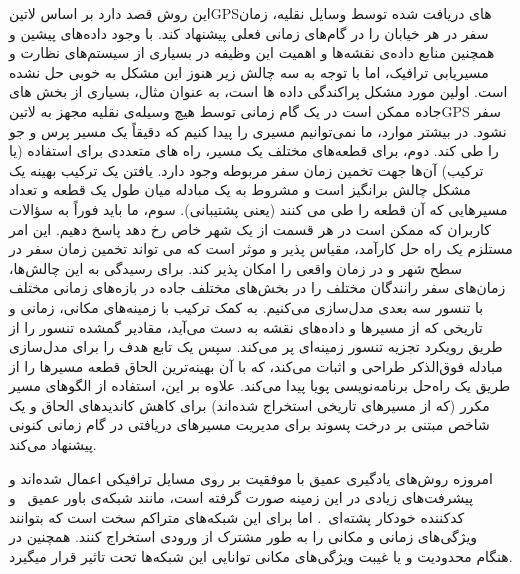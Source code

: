 این روش قصد دارد بر اساس ‌لاتین{GPS}های دریافت شده توسط وسایل نقلیه، زمان سفر در هر خیابان را در گام‌های زمانی فعلی پیشنهاد کند.
با وجود داده‌های پیشین و همچنین منابع داده‌ی نقشه‌ها و اهمیت این وظیفه در بسیاری از سیستم‌های نظارت و مسیریابی ترافیک، اما با توجه به سه چالش زیر هنوز این مشکل به خوبی حل نشده است. اولین مورد مشکل پراکندگی داده ها است، به عنوان مثال، بسیاری از بخش های جاده ممکن است در یک گام زمانی توسط هیچ وسیله‌ی نقلیه مجهز به ‌لاتین{GPS} سفر نشود. در بیشتر موارد، ما نمی‌توانیم مسیری را پیدا کنیم که دقیقاً یک مسیر پرس و جو را طی کند. دوم، برای قطعه‌های مختلف یک مسیر، راه های متعددی برای استفاده (یا ترکیب) آن‌ها جهت تخمین زمان سفر مربوطه وجود دارد. یافتن یک ترکیب بهینه یک مشکل چالش برانگیز است و مشروط به یک مبادله میان طول یک قطعه و تعداد مسیرهایی که آن قطعه را طی می کنند (یعنی پشتیبانی). سوم، ما باید فوراً به سؤالات کاربران که ممکن است در هر قسمت از یک شهر خاص رخ دهد پاسخ دهیم. این امر مستلزم یک راه حل کارآمد، مقیاس پذیر و موثر است که می تواند تخمین زمان سفر در سطح شهر و در زمان واقعی را امکان پذیر کند. برای رسیدگی به این چالش‌ها، زمان‌های سفر رانندگان مختلف را در بخش‌های مختلف جاده در بازه‌های زمانی مختلف با تنسور سه بعدی مدل‌سازی می‌کنیم. به کمک ترکیب با زمینه‌های مکانی، زمانی و تاریخی که از مسیرها و داده‌های نقشه به دست می‌آید، مقادیر گمشده تنسور را از طریق رویکرد تجزیه تنسور زمینه‌ای پر می‌کند. سپس یک تابع هدف را برای مدل‌سازی مبادله فوق‌الذکر طراحی و اثبات می‌کند، که با آن بهینه‌ترین الحاق قطعه مسیرها را از طریق یک راه‌حل برنامه‌نویسی پویا پیدا می‌کند. علاوه بر این، استفاده از الگوهای مسیر مکرر (که از مسیرهای تاریخی استخراج شده‌اند) برای کاهش کاندیدهای الحاق و یک شاخص مبتنی بر درخت پسوند برای مدیریت مسیرهای دریافتی در گام زمانی کنونی پیشنهاد می‌کند.

امروزه روش‌های یادگیری عمیق با موفقیت بر روی مسايل ترافیکی اعمال شده‌اند و پیشرفت‌های زیادی در این زمینه صورت گرفته است، مانند شبکه‌ی باور عمیق~ و کدکننده خودکار پشته‌ای~.
اما برای این شبکه‌های متراکم سخت است که بتوانند ویژگی‌های زمانی و مکانی را به طور مشترک از ورودی استخراج کنند.
همچنین در هنگام محدودیت و یا غیبت ویژگی‌های مکانی توانایی این شبکه‌ها تحت تاثیر قرار میگیرد.

